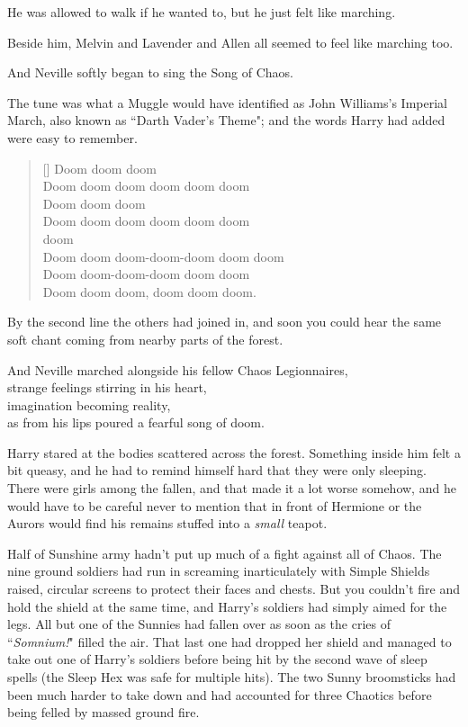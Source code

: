 He was allowed to walk if he wanted to, but he just felt like marching.

Beside him, Melvin and Lavender and Allen all seemed to feel like marching too.

And Neville softly began to sing the Song of Chaos.

The tune was what a Muggle would have identified as John Williams's Imperial March, also known as ``Darth Vader's Theme"; and the words Harry had added were easy to remember.

\baselineskip\settowidth{\versewidth}{Doom doom doom-doom-doom doom doom}
\begin{verse}[\versewidth]
Doom doom doom\\
Doom doom doom doom doom doom\\
Doom doom doom\\
Doom doom doom doom doom doom\\
 doom \\
Doom doom doom-doom-doom doom doom\\
Doom doom-doom-doom doom doom\\
Doom doom doom, doom doom doom.
\end{verse}\baselineskip

By the second line the others had joined in, and soon you could hear the same soft chant coming from nearby parts of the forest.

And Neville marched alongside his fellow Chaos Legionnaires,\\
strange feelings stirring in his heart,\\
imagination becoming reality,\\
as from his lips poured a fearful song of doom.

\later

Harry stared at the bodies scattered across the forest. Something inside him felt a bit queasy, and he had to remind himself hard that they were only sleeping. There were girls among the fallen, and that made it a lot worse somehow, and he would have to be careful never to mention that in front of Hermione or the Aurors would find his remains stuffed into a \emph{small} teapot.

Half of Sunshine army hadn't put up much of a fight against all of Chaos. The nine ground soldiers had run in screaming inarticulately with Simple Shields raised, circular screens to protect their faces and chests. But you couldn't fire and hold the shield at the same time, and Harry's soldiers had simply aimed for the legs. All but one of the Sunnies had fallen over as soon as the cries of ``\emph{Somnium!}" filled the air. That last one had dropped her shield and managed to take out one of Harry's soldiers before being hit by the second wave of sleep spells (the Sleep Hex was safe for multiple hits). The two Sunny broomsticks had been much harder to take down and had accounted for three Chaotics before being felled by massed ground fire.

